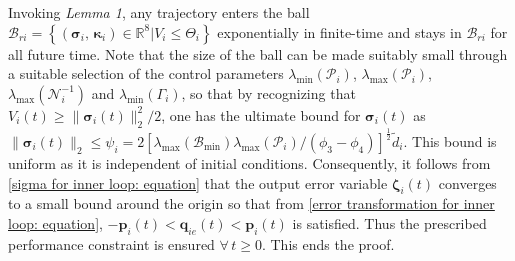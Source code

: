 \documentclass[lettersize,journal]{IEEEtran}
\begin{document}
Invoking \textit{Lemma 1}, any trajectory enters the ball $\mathcal{B}_{r i} = \left \{ \left ( \boldsymbol{\sigma}_i, \, \boldsymbol{\kappa}_i \right ) \in \mathbb{R}^8 | V_i \leq \Theta_i \right\}$ exponentially in finite-time and stays in $\mathcal{B}_{r i}$ for all future time. Note that the size of the ball can be made suitably small through a suitable selection of the control parameters $\lambda_{\text{min}}(\mathcal{P}_i)$, $\lambda_{\text{max}}(\mathcal{P}_i)$, $\lambda_{\text{max}}(\mathcal{N}_i^{-1}) $ and $\lambda_{\text{min}}(\Gamma_i)$, so that by recognizing that $V_i(t) \geq \lVert \boldsymbol{\sigma}_i(t) \rVert_2^2/2$, one has the ultimate bound for $\boldsymbol{\sigma}_i(t)$ as $\lVert \boldsymbol{\sigma}_i(t) \rVert_2 \leq \psi_i = 2 \left[\lambda_{\text{max}}(\mathcal{B}_{\text{min}})\lambda_{\text{max}}(\mathcal{P}_i)/\left(\phi_3 - \phi_4\right)\right]^{\frac{1}{2}}  \tilde{d}_{i}$. This bound is uniform as it is independent of initial conditions. 
Consequently, it follows from \eqref{sigma for inner loop: equation} that the output error variable $\boldsymbol{\zeta}_i(t)$ converges to a small bound around the origin so that from \eqref{error transformation for inner loop: equation}, $- \boldsymbol{p}_{i}(t) < \boldsymbol{q}_{ie}(t) < \boldsymbol{p}_{i}(t)$ is satisfied. Thus the prescribed performance constraint is ensured $\forall \, t \geq 0$. This ends the proof.
\end{document}
